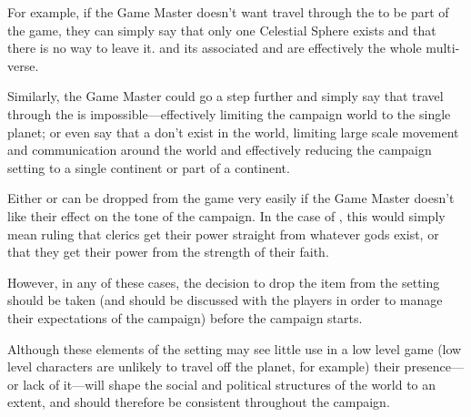 \begin{multicols*}{2}
For example, if the Game Master doesn’t want travel through the  to be part of the game, they can simply say that only one Celestial Sphere exists and that there is no way to leave it.  and its associated  and  are effectively the whole multi-verse.

Similarly, the Game Master could go a step further and simply say that travel through the  is impossible—effectively limiting the campaign world to the single planet; or even say that a  don’t exist in the world, limiting large scale movement and communication around the world and effectively reducing the campaign setting to a single continent or part of a continent.

Either  or  can be dropped from the game very easily if the Game Master doesn’t like their effect on the tone of the campaign. In the case of , this would simply mean ruling that clerics get their power straight from whatever gods exist, or that they get their power from the strength of their faith.

However, in any of these cases, the decision to drop the item from the setting should be taken (and should be discussed with the players in order to manage their expectations of the campaign) before the campaign starts.

Although these elements of the setting may see little use in a low level game (low level characters are unlikely to travel off the planet, for example) their presence—or lack of it—will shape the social and political structures of the world to an extent, and should therefore be consistent throughout the campaign.

\end{multicols*}

